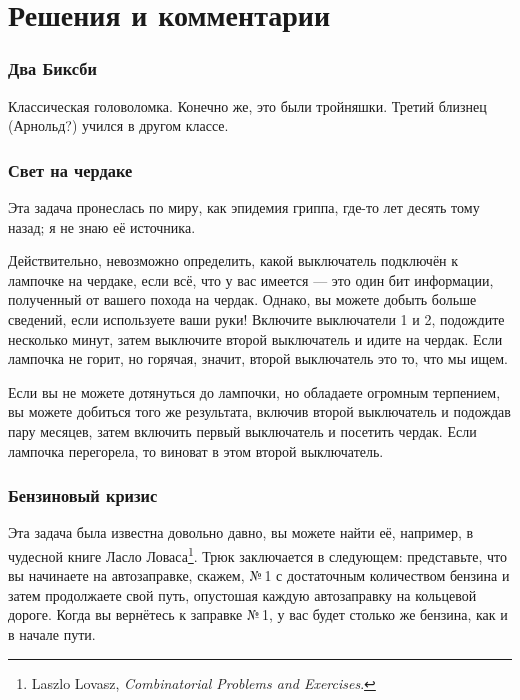 \section*{Решения и комментарии}

\subsubsection*{Два Биксби} %

Классическая головоломка.
Конечно же, это были тройняшки.
Третий близнец (Арнольд?) учился в другом классе.

\subsubsection*{Свет на чердаке} %

Эта задача пронеслась по миру, как эпидемия гриппа, где-то лет десять тому назад; я не знаю её источника.

Действительно, невозможно определить, какой выключатель подключён к лампочке на чердаке, если всё, что у вас имеется --- это один бит информации, полученный от вашего похода на чердак.
Однако, вы можете добыть больше сведений, если используете ваши руки!
Включите выключатели 1 и 2, подождите несколько минут, затем выключите второй выключатель и идите на чердак.
Если лампочка не горит, но горячая, значит, второй выключатель это то, что мы ищем.
\heart

Если вы не можете дотянуться до лампочки, но обладаете огромным терпением, вы можете добиться того же результата, включив второй выключатель и подождав пару месяцев, затем включить первый выключатель и посетить чердак.
Если лампочка перегорела, то виноват в этом второй выключатель.

\subsubsection*{Бензиновый кризис} %

Эта задача была известна довольно давно, вы можете найти её, например, в чудесной книге Ласло Ловаса\footnote{Laszlo Lovasz, \emph{Combinatorial Problems and Exercises}.}.
Трюк заключается в следующем:
представьте, что вы начинаете на автозаправке, скажем, №\,1 с достаточным количеством бензина и затем продолжаете свой путь, опустошая каждую автозаправку на кольцевой дороге.
Когда вы вернётесь к заправке №\,1, 
у вас будет столько же бензина, как и в начале пути.

